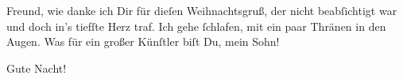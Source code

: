                Freund, wie danke ich Dir für dieſen Weihnachtsgruß, der nicht beabſichtigt war und
               doch in’s tiefſte Herz traf. Ich gehe{ }ſchlafen, mit ein paar Thränen in den Augen.
               Was für ein großer Künſtler biſt Du, mein Sohn!\pend
           
\pstart
           Gute Nacht!\pend
           \endnumbering{}  \newcommand{\dateiname}{L02677}\newcommand{\titel}{Paul Goldmann an Arthur Schnitzler, 24. 12. [1891]}\newcommand{\editorInnen}{Martin Anton Müller und Laura Untner}
